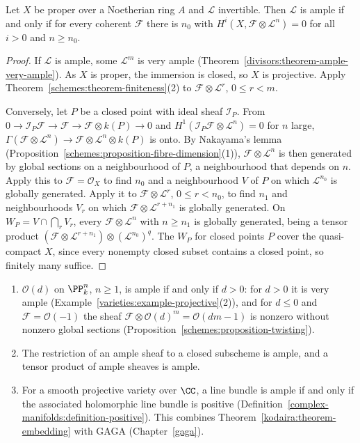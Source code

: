 \begin{theorem}\label{divisors:theorem-cohomological-ampleness}
Let $X$ be proper over a Noetherian ring $A$ and $\mathcal{L}$ invertible. Then $\mathcal{L}$ is ample if and only if for every coherent $\mathcal{F}$ there is $n_0$ with
$H^i(X, \mathcal{F} \otimes \mathcal{L}^n) = 0$ for all $i > 0$ and $n \geq n_0$.
\end{theorem}

\begin{proof}
If $\mathcal{L}$ is ample, some $\mathcal{L}^m$ is very ample (Theorem~\ref{divisors:theorem-ample-very-ample}). As $X$ is proper, the immersion is closed, so $X$ is
projective. Apply Theorem~\ref{schemes:theorem-finiteness}(2) to $\mathcal{F} \otimes \mathcal{L}^r$, $0 \leq r < m$.

Conversely, let $P$ be a closed point with ideal sheaf $\mathcal{I}_P$. From $0 \to \mathcal{I}_P\mathcal{F} \to \mathcal{F} \to \mathcal{F} \otimes k(P) \to 0$ and
$H^1(\mathcal{I}_P\mathcal{F} \otimes \mathcal{L}^n) = 0$ for $n$ large, $\Gamma(\mathcal{F} \otimes \mathcal{L}^n) \to \mathcal{F} \otimes \mathcal{L}^n \otimes k(P)$ is onto. By Nakayama's lemma
(Proposition~\ref{schemes:proposition-fibre-dimension}(1)), $\mathcal{F} \otimes \mathcal{L}^n$ is then generated by global sections on a neighbourhood of $P$,
a neighbourhood that depends on $n$. Apply this to $\mathcal{F} = \mathcal{O}_X$ to find $n_0$ and a neighbourhood $V$ of $P$ on which $\mathcal{L}^{n_0}$ is globally
generated. Apply it to $\mathcal{F} \otimes \mathcal{L}^r$, $0 \leq r < n_0$, to find $n_1$ and neighbourhoods $V_r$ on which $\mathcal{F} \otimes \mathcal{L}^{r + n_1}$ is globally
generated. On $W_P = V \cap \bigcap_rV_r$, every $\mathcal{F} \otimes \mathcal{L}^n$ with $n \geq n_1$ is globally generated, being a tensor product
$(\mathcal{F} \otimes \mathcal{L}^{r + n_1}) \otimes (\mathcal{L}^{n_0})^{q}$. The $W_P$ for closed points $P$ cover the quasi-compact $X$, since every nonempty closed
subset contains a closed point, so finitely many suffice.
\end{proof}

\begin{example}\label{divisors:example-ample}
\begin{enumerate}
\item $\mathcal{O}(d)$ on $\PP^n_k$, $n \geq 1$, is ample if and only if $d > 0$: for $d > 0$ it is very ample (Example~\ref{varieties:example-projective}(2)), and for
$d \leq 0$ and $\mathcal{F} = \mathcal{O}(-1)$ the sheaf $\mathcal{F} \otimes \mathcal{O}(d)^m = \mathcal{O}(dm - 1)$ is nonzero without nonzero global sections
(Proposition~\ref{schemes:proposition-twisting}).
\item The restriction of an ample sheaf to a closed subscheme is ample, and a tensor product of ample sheaves is ample.
\item For a smooth projective variety over $\CC$, a line bundle is ample if and only if the associated holomorphic line bundle is positive
(Definition~\ref{complex-manifolds:definition-positive}). This combines Theorem~\ref{kodaira:theorem-embedding} with GAGA (Chapter~\ref{gaga}).
\end{enumerate}
\end{example}


